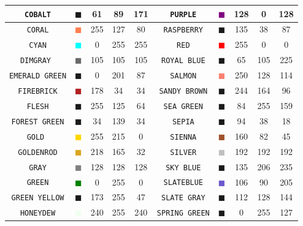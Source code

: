 \documentclass[11pt]{book}
\newcommand{\ct}{\tt\small}
\begin{document}
\begin{table}[p]
\begin{center}
\begin{tabular}{|c|c|c|c|c|c||c|c|c|c|}
{\ct COBALT} & \textcolor{COBALT} {$\blacksquare$} & 61& 89& 171& {\ct PURPLE} &  \textcolor{PURPLE} {$\blacksquare$} & 128& 0& 128  \\ \hline
{\ct CORAL} & \textcolor{CORAL} {$\blacksquare$} & 255& 127& 80& {\ct RASPBERRY} &  \textcolor{RASPBERRY} {$\blacksquare$} & 135& 38& 87  \\ \hline
{\ct CYAN} & \textcolor{CYAN} {$\blacksquare$} & 0& 255& 255& {\ct RED} &  \textcolor{RED} {$\blacksquare$} & 255& 0& 0  \\ \hline
{\ct DIMGRAY } & \textcolor{DIMGRAY } {$\blacksquare$} & 105& 105& 105& {\ct ROYAL BLUE} &  \textcolor{ROYAL BLUE} {$\blacksquare$} & 65& 105& 225  \\ \hline
{\ct EMERALD GREEN} & \textcolor{EMERALD GREEN} {$\blacksquare$} & 0& 201& 87& {\ct SALMON} &  \textcolor{SALMON} {$\blacksquare$} & 250& 128& 114  \\ \hline
{\ct FIREBRICK} & \textcolor{FIREBRICK} {$\blacksquare$} & 178& 34& 34& {\ct SANDY BROWN} &  \textcolor{SANDY BROWN} {$\blacksquare$} & 244& 164& 96  \\ \hline
{\ct FLESH} & \textcolor{FLESH} {$\blacksquare$} & 255& 125& 64& {\ct SEA GREEN} &  \textcolor{SEA GREEN} {$\blacksquare$} & 84& 255& 159  \\ \hline
{\ct FOREST GREEN} & \textcolor{FOREST GREEN} {$\blacksquare$} & 34& 139& 34& {\ct SEPIA} &  \textcolor{SEPIA} {$\blacksquare$} & 94& 38& 18  \\ \hline
{\ct GOLD } & \textcolor{GOLD } {$\blacksquare$} & 255& 215& 0& {\ct SIENNA} &  \textcolor{SIENNA} {$\blacksquare$} & 160& 82& 45  \\ \hline
{\ct GOLDENROD} & \textcolor{GOLDENROD} {$\blacksquare$} & 218& 165& 32& {\ct SILVER} &  \textcolor{SILVER} {$\blacksquare$} & 192& 192& 192  \\ \hline
{\ct GRAY} & \textcolor{GRAY} {$\blacksquare$} & 128& 128& 128& {\ct SKY BLUE} &  \textcolor{SKY BLUE} {$\blacksquare$} & 135& 206& 235  \\ \hline
{\ct GREEN} & \textcolor{GREEN} {$\blacksquare$} & 0& 255& 0& {\ct SLATEBLUE} &  \textcolor{SLATEBLUE} {$\blacksquare$} & 106& 90& 205  \\ \hline
{\ct GREEN YELLOW} & \textcolor{GREEN YELLOW} {$\blacksquare$} & 173& 255& 47& {\ct SLATE GRAY} &  \textcolor{SLATE GRAY} {$\blacksquare$} & 112& 128& 144  \\ \hline
{\ct HONEYDEW} & \textcolor{HONEYDEW} {$\blacksquare$} & 240& 255& 240& {\ct SPRING GREEN} &  \textcolor{SPRING GREEN} {$\blacksquare$} & 0& 255& 127  \\ \hline

\end{tabular}
\end{center}
\end{table}
\end{document}
